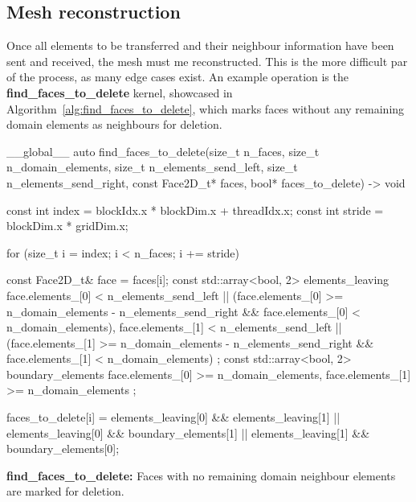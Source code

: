 \subsection{Mesh reconstruction}\label{subsection:load_balancing:implementation:reconstruction}

Once all elements to be transferred and their neighbour information have been sent and received, the
mesh must me reconstructed. This is the more difficult par of the process, as many edge cases exist.
An example operation is the \textbf{find\_faces\_to\_delete} kernel, showcased in
Algorithm~\ref{alg:find_faces_to_delete}, which marks faces without any remaining domain elements as
neighbours for deletion.

\begin{algorithm}[H]
    \begin{cuda}
        __global__
        auto find_faces_to_delete(size_t n_faces, size_t n_domain_elements, 
                size_t n_elements_send_left, size_t n_elements_send_right, 
                const Face2D_t* faces, bool* faces_to_delete) -> void {

            const int index = blockIdx.x * blockDim.x + threadIdx.x;
            const int stride = blockDim.x * gridDim.x;

            for (size_t i = index; i < n_faces; i += stride) {
                const Face2D_t& face = faces[i];
                const std::array<bool, 2> elements_leaving {
                    face.elements_[0] < n_elements_send_left 
                        || (face.elements_[0] >= n_domain_elements - n_elements_send_right 
                            && face.elements_[0] < n_domain_elements),
                    face.elements_[1] < n_elements_send_left 
                        || (face.elements_[1] >= n_domain_elements - n_elements_send_right 
                            && face.elements_[1] < n_domain_elements)
                };
                const std::array<bool, 2> boundary_elements {
                    face.elements_[0] >= n_domain_elements,
                    face.elements_[1] >= n_domain_elements
                };

                faces_to_delete[i] = elements_leaving[0] && elements_leaving[1] 
                                  || elements_leaving[0] && boundary_elements[1] 
                                  || elements_leaving[1] && boundary_elements[0];
            }
        }\end{cuda}
\caption{\textbf{find\_faces\_to\_delete:} Faces with no remaining domain neighbour elements are marked for deletion.}\label{alg:find_faces_to_delete}
\end{algorithm}


